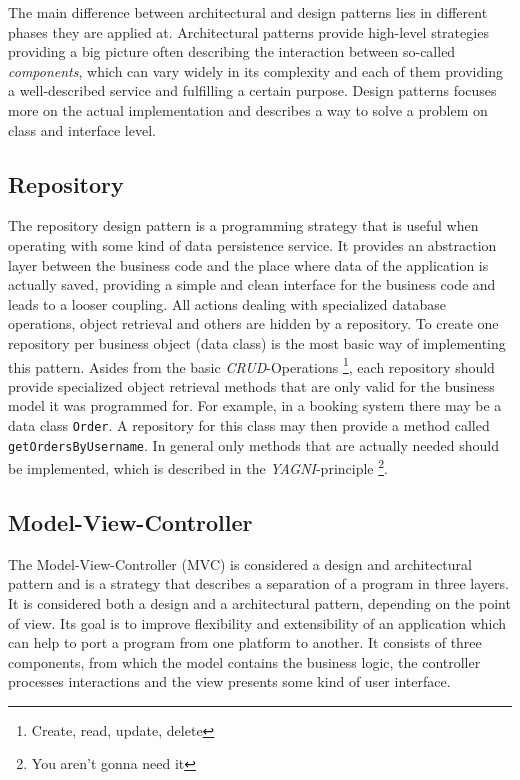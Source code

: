 The main difference between architectural and design patterns lies in different phases they are applied at. Architectural patterns provide high-level strategies providing a big picture often describing the interaction between so-called \emph{components}, which can vary widely in its complexity and each of them providing a well-described service and fulfilling a certain purpose. Design patterns focuses more on the actual implementation and describes a way to solve a problem on class and interface level. 

\subsection{Repository}
\label{sec:repository}
The repository design pattern is a programming strategy that is useful when operating with some kind of data persistence service. It provides an abstraction layer between the business code and the place where data of the application is actually saved, providing a simple and clean interface for the business code and leads to a looser coupling. All actions dealing with specialized database operations, object retrieval and others are hidden by a repository. To create one repository per business object (data class) is the most basic way of implementing this pattern. Asides from the basic \emph{CRUD}-Operations \footnote{Create, read, update, delete}, each repository should provide specialized object retrieval methods that are only valid for the business model it was programmed for. For example, in a booking system there may be a data class \texttt{Order}. A repository for this class may then provide a method called \texttt{getOrdersByUsername}. In general only methods that are actually needed should be implemented, which is described in the \emph{YAGNI}-principle \footnote{You aren't gonna need it}.
\subsection{Model-View-Controller}
The Model-View-Controller (MVC) is considered a design and architectural pattern and is a strategy that describes a separation of a program in three layers. It is considered both a design and a architectural pattern, depending on the point of view.  Its goal is to improve flexibility and extensibility of an application which can help to port a program from one platform to another. It consists of three components, from which the model contains the business logic, the controller processes interactions and the view presents some kind of user interface. 

